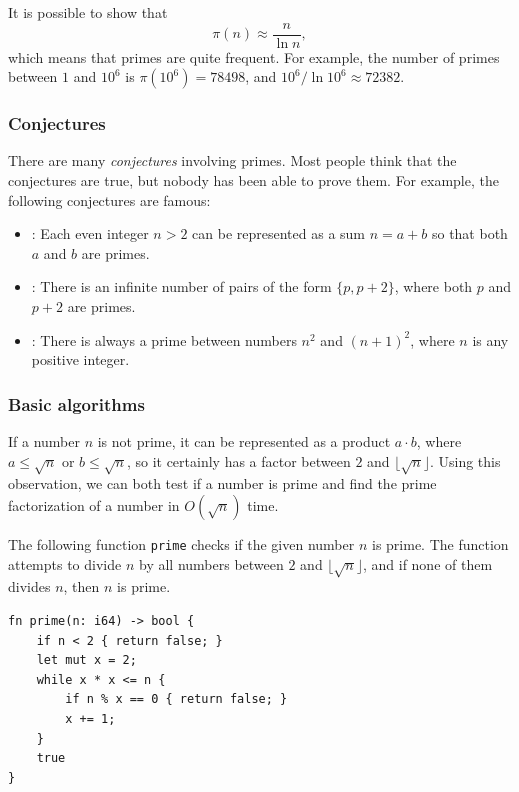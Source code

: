 It is possible to show that
\[\pi(n) \approx \frac{n}{\ln n},\]
which means that primes are quite frequent.
For example, the number of primes between
$1$ and $10^6$ is $\pi(10^6)=78498$,
and $10^6 / \ln 10^6 \approx 72382$.

\subsubsection{Conjectures}

There are many \emph{conjectures} involving primes.
Most people think that the conjectures are true,
but nobody has been able to prove them.
For example, the following conjectures are famous:

\begin{itemize}
\item {}:
Each even integer $n>2$ can be represented as a
sum $n=a+b$ so that both $a$ and $b$ are primes.
\item {}:
There is an infinite number of pairs
of the form $\{p,p+2\}$,
where both $p$ and $p+2$ are primes.
\item {}:
There is always a prime between numbers
$n^2$ and $(n+1)^2$, where $n$ is any positive integer.
\end{itemize}

\subsubsection{Basic algorithms}

If a number $n$ is not prime,
it can be represented as a product $a \cdot b$,
where $a \le \sqrt n$ or $b \le \sqrt n$,
so it certainly has a factor between $2$ and $\lfloor \sqrt n \rfloor$.
Using this observation, we can both test
if a number is prime and find the prime factorization
of a number in $O(\sqrt n)$ time.

The following function \texttt{prime} checks
if the given number $n$ is prime.
The function attempts to divide $n$ by
all numbers between $2$ and $\lfloor \sqrt n \rfloor$,
and if none of them divides $n$, then $n$ is prime.

\begin{lstlisting}
fn prime(n: i64) -> bool {
    if n < 2 { return false; }
    let mut x = 2;
    while x * x <= n {
        if n % x == 0 { return false; }
        x += 1;
    }
    true
}
\end{lstlisting}

